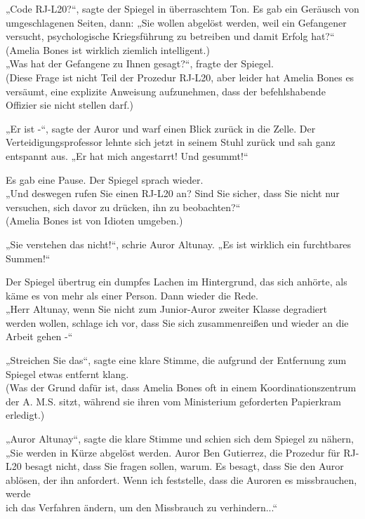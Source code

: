 {„Code RJ-L20?“, sagte der Spiegel in überraschtem Ton. Es gab ein Geräusch von umgeschlagenen Seiten, dann: „Sie wollen abgelöst werden, weil ein Gefangener versucht, psychologische Kriegsführung zu betreiben und damit Erfolg hat?“\\ (Amelia Bones ist wirklich ziemlich intelligent.)\\ „Was hat der Gefangene zu Ihnen gesagt?“, fragte der Spiegel.\\ (Diese Frage ist nicht Teil der Prozedur RJ-L20, aber leider hat Amelia Bones es versäumt, eine explizite Anweisung aufzunehmen, dass der befehlshabende Offizier sie nicht stellen darf.)

„Er ist -“, sagte der Auror und warf einen Blick zurück in die Zelle. Der Verteidigungsprofessor lehnte sich jetzt in seinem Stuhl zurück und sah ganz entspannt aus. „Er hat mich angestarrt! Und gesummt!“

Es gab eine Pause. Der Spiegel sprach wieder.\\ „Und deswegen rufen Sie einen RJ-L20 an? Sind Sie sicher, dass Sie nicht nur versuchen, sich davor zu drücken, ihn zu beobachten?“\\ (Amelia Bones ist von Idioten umgeben.)

„Sie verstehen das nicht!“, schrie Auror Altunay. „Es ist wirklich ein furchtbares Summen!“

Der Spiegel übertrug ein dumpfes Lachen im Hintergrund, das sich anhörte, als käme es von mehr als einer Person. Dann wieder die Rede.\\ „Herr Altunay, wenn Sie nicht zum Junior-Auror zweiter Klasse degradiert werden wollen, schlage ich vor, dass Sie sich zusammenreißen und wieder an die Arbeit gehen -“

„Streichen Sie das“, sagte eine klare Stimme, die aufgrund der Entfernung zum Spiegel etwas entfernt klang.\\ (Was der Grund dafür ist, dass Amelia Bones oft in einem Koordinationszentrum der A. M.S. sitzt, während sie ihren vom Ministerium geforderten Papierkram erledigt.)

„Auror Altunay“, sagte die klare Stimme und schien sich dem Spiegel zu nähern, „Sie werden in Kürze abgelöst werden. Auror Ben Gutierrez, die Prozedur für RJ-L20 besagt nicht, dass Sie fragen sollen, warum. Es besagt, dass Sie den Auror ablösen, der ihn anfordert. Wenn ich feststelle, dass die Auroren es missbrauchen, werde\\ ich das Verfahren ändern, um den Missbrauch zu verhindern...“

}
